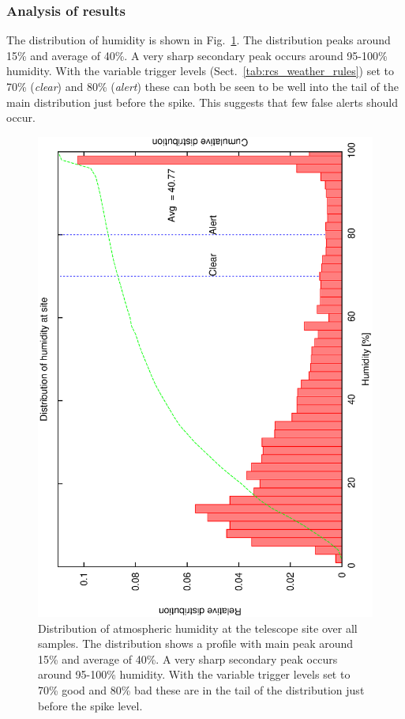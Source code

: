 \subsubsection{Analysis of results}
\label{ss:weather_anal}
The distribution of humidity is shown in Fig.~\ref{fig:met_humidity_dist}. The distribution peaks around 15\% and average of 40\%. A very sharp secondary peak occurs around 95-100\% humidity. With the variable trigger levels (Sect.~\ref{tab:rcs_weather_rules}) set to 70\% (\emph{clear}) and 80\% (\emph{alert}) these can both be seen to be well into the tail of the main distribution just before the spike. This suggests that few false alerts should occur.

\begin{figure}[htbp]
  \begin{center}
    \includegraphics[scale=0.4, angle=-90]{figures/ecs/hum.eps}
  \end{center}
  \caption[Distribution of humidity at telescope site.]
{Distribution of atmospheric humidity at the telescope site over all samples. The distribution shows a profile with main peak around 15\% and average of 40\%. A very sharp secondary peak occurs around 95-100\% humidity. With the variable trigger levels set to 70\% good and 80\% bad these are in the tail of the distribution just before the spike level.}
  \label{fig:met_humidity_dist}
\end{figure}

